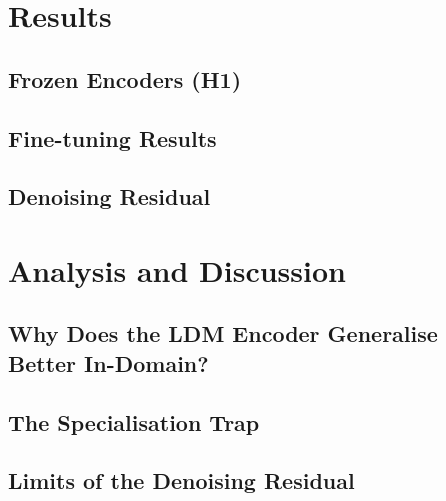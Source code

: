 \documentclass[10pt,twocolumn]{article}
\begin{document}
\section{Results}

\subsection{Frozen Encoders (H1)}

\subsection{Fine-tuning Results}

\subsection{Denoising Residual}

\section{Analysis and Discussion}

\subsection{Why Does the LDM Encoder Generalise Better In-Domain?}

\subsection{The Specialisation Trap}

\subsection{Limits of the Denoising Residual}

\end{document}
